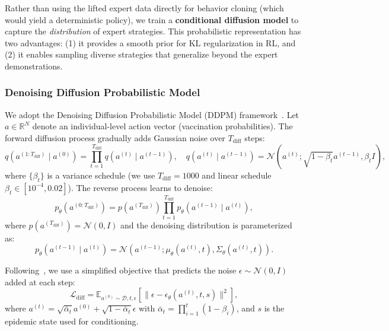 Rather than using the lifted expert data directly for behavior cloning (which would
yield a deterministic policy), we train a \textbf{conditional diffusion model} to
capture the \emph{distribution} of expert strategies. This probabilistic representation
has two advantages: (1) it provides a smooth prior for KL regularization in RL, and
(2) it enables sampling diverse strategies that generalize beyond the expert demonstrations.

\subsubsection{Denoising Diffusion Probabilistic Model}

We adopt the Denoising Diffusion Probabilistic Model (DDPM) framework~\citep{ho2020denoising}.
Let $a \in \mathbb{R}^N$ denote an individual-level action vector (vaccination probabilities).
The forward diffusion process gradually adds Gaussian noise over $T_{\text{diff}}$ steps:
\begin{equation}
q(a^{(1:T_{\text{diff}})} \mid a^{(0)}) = \prod_{t=1}^{T_{\text{diff}}} q(a^{(t)} \mid a^{(t-1)}),
\quad
q(a^{(t)} \mid a^{(t-1)}) = \mathcal{N}(a^{(t)}; \sqrt{1-\beta_t} a^{(t-1)}, \beta_t I),
\end{equation}
where $\{\beta_t\}$ is a variance schedule (we use $T_{\text{diff}}=1000$ and linear
schedule $\beta_t \in [10^{-4}, 0.02]$). The reverse process learns to denoise:
\begin{equation}
p_\theta(a^{(0:T_{\text{diff}})}) = p(a^{(T_{\text{diff}})}) \prod_{t=1}^{T_{\text{diff}}}
p_\theta(a^{(t-1)} \mid a^{(t)}),
\end{equation}
where $p(a^{(T_{\text{diff}})}) = \mathcal{N}(0, I)$ and the denoising distribution
is parameterized as:
\begin{equation}
p_\theta(a^{(t-1)} \mid a^{(t)}) = \mathcal{N}(a^{(t-1)}; \mu_\theta(a^{(t)}, t), \Sigma_\theta(a^{(t)}, t)).
\end{equation}

Following~\cite{ho2020denoising}, we use a simplified objective that predicts the
noise $\epsilon \sim \mathcal{N}(0,I)$ added at each step:
\begin{equation}
\mathcal{L}_{\text{diff}} = \mathbb{E}_{a^{(0)} \sim \mathcal{D}, t, \epsilon}
\left[ \|\epsilon - \epsilon_\theta(a^{(t)}, t, s)\|^2 \right],
\label{eq:ddpm_loss}
\end{equation}
where $a^{(t)} = \sqrt{\bar{\alpha}_t} a^{(0)} + \sqrt{1-\bar{\alpha}_t} \epsilon$
with $\bar{\alpha}_t = \prod_{i=1}^t (1-\beta_i)$, and $s$ is the epidemic state
used for conditioning.

